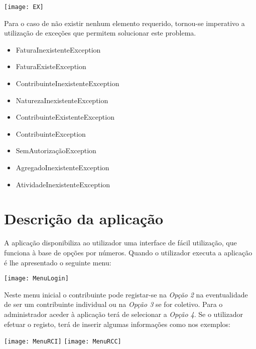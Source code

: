 \documentclass[10pt,a4paper]{article}
\begin{document}
\begin{center}
\graphicspath{ {/home/jessica/Desktop/} }
\texttt{[image: EX]}\\
\end{center}

Para o caso de não existir nenhum elemento requerido, tornou-se imperativo a utilização de exceções que permitem solucionar este problema.\\
\begin{itemize}
 \item FaturaInexistenteException
 \item FaturaExisteException
 \item ContribuinteInexistenteException
 \item NaturezaInexistenteException
 \item ContribuinteExistenteException
 \item ContribuinteException
 \item SemAutorizaçãoException
 \item AgregadoInexistenteException
 \item AtividadeInexistenteException 
\end{itemize}

\cleardoublepage

\section{Descrição da aplicação}
\label{sec:solucao}
A aplicação disponibiliza ao utilizador uma interface de fácil utilização, que funciona à base de opções por números. Quando o utilizador executa a aplicação é lhe apresentado o seguinte menu:

\begin{center}
\graphicspath{ {/home/jessica/Desktop/} }
\texttt{[image: MenuLogin]}\\
\end{center}


Neste menu inicial o contribuinte pode registar-se na \textit{Opção 2} na eventualidade de ser um contribuinte individual ou na \textit{Opção 3} se for coletivo. Para o administrador aceder à aplicação terá de selecionar a \textit{Opção 4}. Se o utilizador efetuar o registo, terá de inserir algumas informações como nos exemplos:


\graphicspath{ {/home/jessica/Desktop/} }
\begin{center}
	\texttt{[image: MenuRCI]}  \quad
	\texttt{[image: MenuRCC]}
\end{center}
\end{document}

